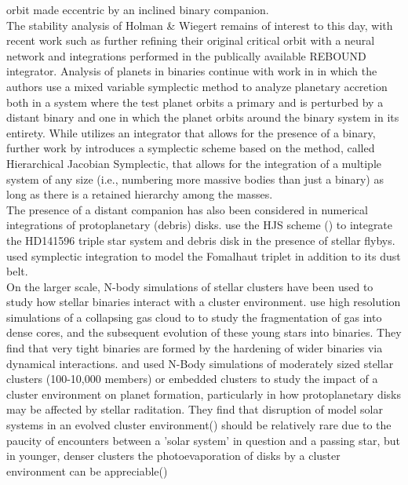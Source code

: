 \documentclass[manuscript]{aastex631}
\begin{document}
orbit made eccentric by an inclined binary companion.\\
The stability analysis of Holman \& Wiegert remains of interest to this day, with recent work such as \cite{lam18} further refining
their original critical orbit with a neural network and integrations performed in the publically available REBOUND integrator.
 Analysis of planets in binaries continue with work 
in \cite{cha02} in which the authors use a mixed variable symplectic method to analyze planetary accretion both in a system where the test planet orbits a primary and 
is perturbed by a distant binary and one in which the planet orbits around the binary system in its entirety. While \cite{cha02} utilizes an integrator that allows for the presence 
of a binary, further work by \cite{beu03} introduces a symplectic scheme based on the \cite{wis91} method, called Hierarchical Jacobian Symplectic, that allows for the 
integration of a multiple system of any size (i.e., numbering more massive bodies than just a binary) as long as there is a retained
hierarchy among the masses.  \\
The presence of a distant companion has also been considered in numerical integrations of protoplanetary (debris) disks. \cite{rec09} use the HJS scheme (\cite{beu03}) 
to integrate the HD141596 triple star system and debris disk in the presence of stellar flybys. 
\cite{beu14} used symplectic integration to model the Fomalhaut triplet in addition to its dust belt.  \\

\indent On the larger scale, N-body simulations of stellar clusters have been used to study how stellar binaries interact with a cluster environment. \cite{bat03} 
use high resolution simulations of a collapsing gas cloud to to study the fragmentation of gas into dense cores, 
and the subsequent evolution of these young stars into binaries. They find that very
 tight binaries are formed by the hardening of wider binaries via dynamical interactions. \cite{ada06} and \cite{pro09} used N-Body simulations of moderately sized stellar clusters
  (100-10,000 members) or embedded clusters to study the impact of a cluster environment on planet formation, particularly in how protoplanetary disks may be affected by stellar raditation.
  They find that disruption of model solar systems in an evolved cluster environment(\cite{ada06}) should be relatively rare due to the paucity of encounters between a 'solar system' 
  in question and a passing star, but in younger, denser clusters the photoevaporation of disks by a cluster environment can be appreciable(\cite{pro09})
  
\end{document}
